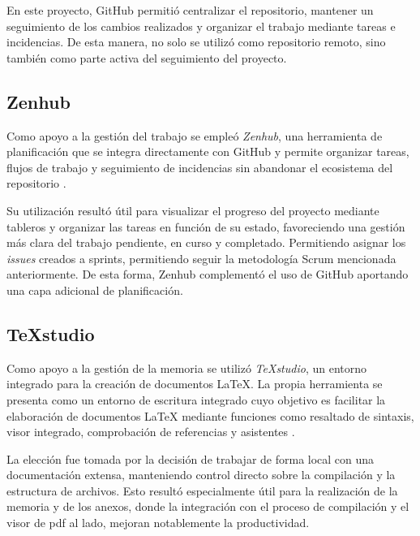 En este proyecto, GitHub permitió centralizar el repositorio, mantener un seguimiento de los cambios realizados y organizar el trabajo mediante tareas e incidencias. De esta manera, no solo se utilizó como repositorio remoto, sino también como parte activa del seguimiento del proyecto.

\subsection{Zenhub}

Como apoyo a la gestión del trabajo se empleó \textit{Zenhub}, una herramienta de planificación que se integra directamente con GitHub y permite organizar tareas, flujos de trabajo y seguimiento de incidencias sin abandonar el ecosistema del repositorio \cite{zenhub}.

Su utilización resultó útil para visualizar el progreso del proyecto mediante tableros y organizar las tareas en función de su estado, favoreciendo una gestión más clara del trabajo pendiente, en curso y completado. Permitiendo asignar los \textit{issues} creados a sprints, permitiendo seguir la metodología Scrum mencionada anteriormente. De esta forma, Zenhub complementó el uso de GitHub aportando una capa adicional de planificación.

\subsection{TeXstudio}

Como apoyo a la gestión de la memoria se utilizó \textit{\TeX{}studio}, un entorno integrado para la creación de documentos \LaTeX{}. La propia herramienta se presenta como un entorno de escritura integrado cuyo objetivo es facilitar la elaboración de documentos \LaTeX{} mediante funciones como resaltado de sintaxis, visor integrado, comprobación de referencias y asistentes \cite{wiki:texstudio}.

La elección fue tomada por la decisión de trabajar de forma local con una documentación  extensa, manteniendo control directo sobre la compilación y la estructura de archivos. Esto resultó especialmente útil para la realización de la memoria y de los anexos, donde la integración con el proceso de compilación y el visor de pdf al lado, mejoran notablemente la productividad.


